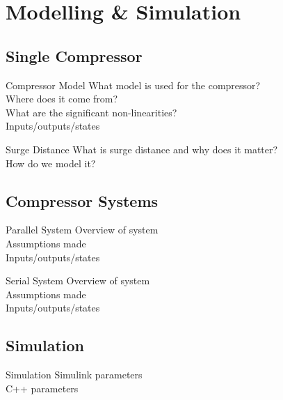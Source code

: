 \section{Modelling \& Simulation}

\subsection{Single Compressor}
\begin{frame}{Compressor Model}
  What model is used for the compressor?\\
  Where does it come from?\\
  What are the significant non-linearities?\\
  Inputs/outputs/states
\end{frame}

\begin{frame}{Surge Distance}
  What is surge distance and why does it matter?\\
  How do we model it?\\
\end{frame}

\subsection{Compressor Systems}

\begin{frame}{Parallel System}
  Overview of system\\
  Assumptions made\\
  Inputs/outputs/states
\end{frame}

\begin{frame}{Serial System}
  Overview of system\\
  Assumptions made\\
  Inputs/outputs/states
\end{frame}

\subsection{Simulation}
\begin{frame}{Simulation}
  Simulink parameters\\
  C++ parameters
\end{frame}

